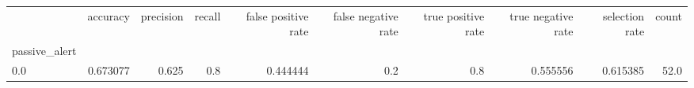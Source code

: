 \begin{tabular}{lrrrrrrrrr}
\toprule
{} &  accuracy &  precision &  recall &  false positive rate &  false negative rate &  true positive rate &  true negative rate &  selection rate &  count \\
passive\_alert &           &            &         &                      &                      &                     &                     &                 &        \\
\midrule
0.0           &  0.673077 &      0.625 &     0.8 &             0.444444 &                  0.2 &                 0.8 &            0.555556 &        0.615385 &   52.0 \\
\bottomrule
\end{tabular}
